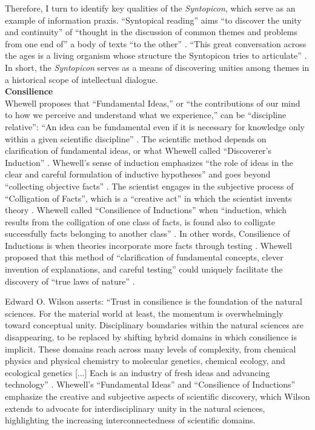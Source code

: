 Therefore, I turn to identify key qualities of the \textit{Syntopicon}, which serve as an example of information praxis. “Syntopical reading” aims “to discover the unity and continuity” of “thought in the discussion of common themes and problems from one end of” a body of texts “to the other” \citep[p. xii]{adler_great_1952-2}. “This great conversation across the ages is a living organism whose structure the Syntopicon tries to articulate” \citep[p. xii]{adler_great_1952-2} . In short, the \textit{Syntopicon} serves as a means of discovering unities among themes in a historical scope of intellectual dialogue.\\
\textbf{Consilience} \\ 
Whewell proposes that “Fundamental Ideas,” or “the contributions of our mind to how we perceive and understand what we experience,” can be “discipline relative”: “An idea can be fundamental even if it is necessary for knowledge only within a given scientific discipline” \citep{hepburn_scientific_2021} . The scientific method depends on clarification of fundamental ideas, or what Whewell called “Discoverer’s Induction” \citep{hepburn_scientific_2021} . Whewell’s sense of induction emphasizes “the role of ideas in the clear and careful formulation of inductive hypotheses” and goes beyond “collecting objective facts” \citep{hepburn_scientific_2021} . The scientist engages in the subjective process of “Colligation of Facts”, which is a “creative act” in which the scientist invents theory \citep{hepburn_scientific_2021}. Whewell called “Consilience of Inductions” when “induction, which results from the colligation of one class of facts, is found also to colligate successfully facts belonging to another class” \citep{snyder_william_2023}. In other words, Consilience of Inductions is when theories incorporate more facts through testing \citep{hepburn_scientific_2021} . Whewell proposed that this method of “clarification of fundamental concepts, clever invention of explanations, and careful testing” could uniquely facilitate the discovery of “true laws of nature” \citep{hepburn_scientific_2021} .

Edward O. Wilson asserts: “Trust in consilience is the foundation of the natural sciences. For the material world at least, the momentum is overwhelmingly toward conceptual unity. Disciplinary boundaries within the natural sciences are disappearing, to be replaced by shifting hybrid domains in which consilience is implicit. These domains reach across many levels of complexity, from chemical physics and physical chemistry to molecular genetics, chemical ecology, and ecological genetics [...] Each is an industry of fresh ideas and advancing technology” \citep[p. 11]{wilson_consilience_1999}. Whewell’s “Fundamental Ideas” and “Consilience of Inductions” emphasize the creative and subjective aspects of scientific discovery, which Wilson extends to advocate for interdisciplinary unity in the natural sciences, highlighting the increasing interconnectedness of scientific domains. 

